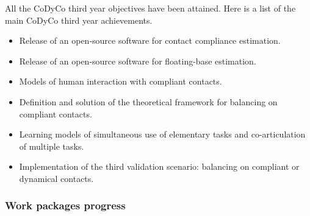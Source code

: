 \documentclass[12pt,a4paper,twoside]{article}
\begin{document}
All the CoDyCo third year objectives have been attained. Here is a list of the main CoDyCo third year
achievements. \begin{itemize}

\item Release of an open-source software for contact compliance estimation.

\item Release of an open-source software for floating-base estimation.

\item Models of human interaction with compliant contacts.

\item Definition and solution of the theoretical framework for balancing on compliant contacts.

\item Learning models of simultaneous use of elementary tasks and co-articulation of multiple tasks.

\item Implementation of the third validation scenario: balancing on compliant or dynamical contacts.

\end{itemize}

\subsubsection{Work packages progress}





























\end{document}
